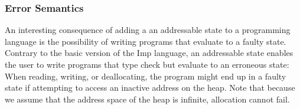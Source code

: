 
\subsubsection{Error Semantics}
An interesting consequence of adding a an addressable state to a programming language is the possibility of writing programs that evaluate to a faulty state. Contrary to the basic version of the Imp language, an addressable state enables the user to write programs that type check but evaluate to an erroneous state: When reading, writing, or deallocating, the program might end up in a faulty state if attempting to access an inactive address on the heap. Note that because we assume that the address space of the heap is infinite, allocation cannot fail. 